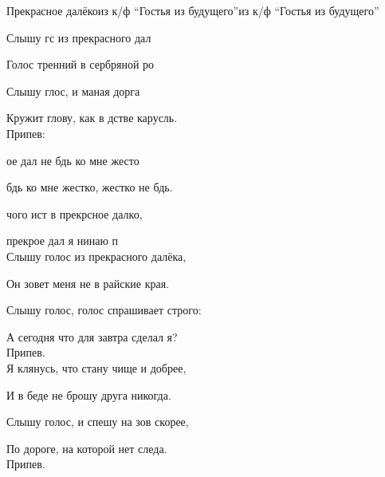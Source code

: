 \documentclass[11pt,a5paper]{book}
\renewcommand{\tt}{\indent \indent}
\begin{document}
\begin{song}{Прекрасное далёко}{}{из к/ф “Гостья из будущего”}{из к/ф “Гостья из будущего”}{}{}

Слышу гс из прекрасного дал\par        	
Голос тренний в сербряной ро\par
Слышу глос, и маная дорга \par
Кружит глову, как в дстве карусль.\\
 
Припев:\par
{}ое дал не бдь ко мне жесто\par
{} бдь ко мне жестко, жестко не бдь. \par
{} чого ист в прекрсное далко,\par
{} прекрое дал я нинаю п\\
 
Слышу голос из прекрасного далёка,\par
Он зовет меня не в райские края.\par
Слышу голос, голос спрашивает строго:\par
А сегодня что для завтра сделал я?\\
 
Припев.\\
 
Я клянусь, что стану чище и добрее,\par
И в беде не брошу друга никогда.\par
Слышу голос, и спешу на зов скорее,\par
По дороге, на которой нет следа.\\
 
Припев.\\

\end{song} 
\end{document}

